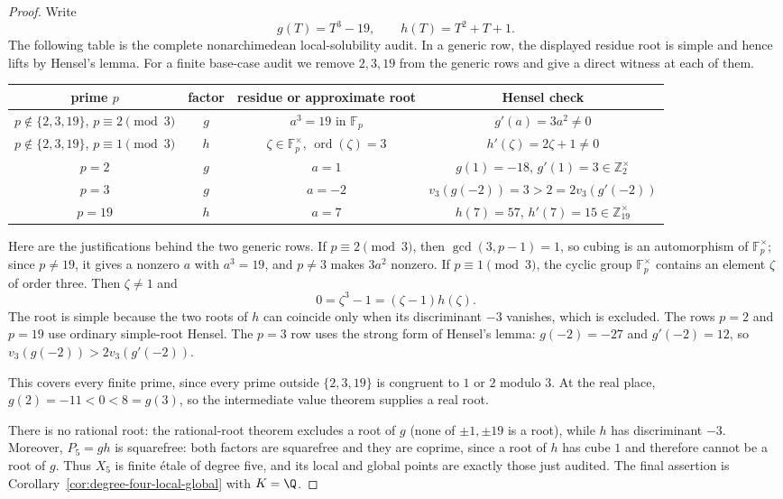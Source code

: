 \begin{proof}
Write
\[
 g(T)=T^3-19,\qquad h(T)=T^2+T+1.
\]
The following table is the complete nonarchimedean local-solubility audit.
In a generic row, the displayed residue root is simple and hence lifts by
Hensel's lemma.  For a finite base-case audit we remove \(2,3,19\) from the
generic rows and give a direct witness at each of them.
\begin{center}
\small
\begin{tabular}{c|c|c|c}
prime $p$ & factor & residue or approximate root & Hensel check\\
\hline
$p\notin\{2,3,19\}$, $p\equiv2\pmod3$
 & $g$ & $a^3=19$ in $\mathbb F_p$
 & $g'(a)=3a^2\neq0$\\
$p\notin\{2,3,19\}$, $p\equiv1\pmod3$
 & $h$ & $\zeta\in\mathbb F_p^\times$, $\operatorname{ord}(\zeta)=3$
 & $h'(\zeta)=2\zeta+1\neq0$\\
$p=2$ & $g$ & $a=1$ & $g(1)=-18$, $g'(1)=3\in\mathbb Z_2^\times$\\
$p=3$ & $g$ & $a=-2$ &
 $v_3(g(-2))=3>2=2v_3(g'(-2))$\\
$p=19$ & $h$ & $a=7$ &
 $h(7)=57$, $h'(7)=15\in\mathbb Z_{19}^\times$
\end{tabular}
\end{center}
Here are the justifications behind the two generic rows.  If
$p\equiv2\pmod3$, then $\gcd(3,p-1)=1$, so cubing is an automorphism of
$\mathbb F_p^\times$; since $p\neq19$, it gives a nonzero $a$ with
$a^3=19$, and $p\neq3$ makes $3a^2$ nonzero.  If $p\equiv1\pmod3$, the
cyclic group $\mathbb F_p^\times$ contains an element $\zeta$ of order three.
Then $\zeta\neq1$ and
\[
 0=\zeta^3-1=(\zeta-1)h(\zeta).
\]
The root is simple because the two roots of $h$ can coincide only when its
discriminant $-3$ vanishes, which is excluded.  The rows $p=2$ and $p=19$
use ordinary simple-root Hensel.  The $p=3$ row uses the strong form of
Hensel's lemma: $g(-2)=-27$ and $g'(-2)=12$, so
$v_3(g(-2))>2v_3(g'(-2))$.

This covers every finite prime, since every prime outside
$\{2,3,19\}$ is congruent to $1$ or $2$ modulo $3$.  At the real place,
$g(2)=-11<0<8=g(3)$, so the intermediate value theorem supplies a real
root.

There is no rational root: the rational-root theorem excludes a root of
$g$ (none of $\pm1,\pm19$ is a root), while $h$ has discriminant $-3$.
Moreover, \(P_5=gh\) is squarefree: both factors are squarefree and they are
coprime, since a root of \(h\) has cube \(1\) and therefore cannot be a root
of \(g\).  Thus \(X_5\) is finite \'etale of degree five, and its local and
global points are exactly those just audited.  The final assertion is
Corollary~\ref{cor:degree-four-local-global} with \(K=\Q\).
\end{proof}

